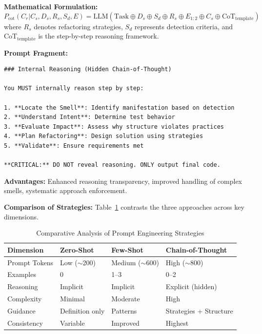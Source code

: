 \documentclass[12pt]{article}
\begin{document}
\textbf{Mathematical Formulation:}
\begin{equation}
    P_{\text{cot}}(C_r | C_s, D_s, R_s, S_d, E) = \text{LLM}(\text{Task} \oplus D_s \oplus S_d \oplus R_s \oplus E_{1:2} \oplus C_s \oplus \text{CoT}_{\text{template}})
\end{equation}
where $R_s$ denotes refactoring strategies, $S_d$ represents detection criteria, and $\text{CoT}_{\text{template}}$ is the step-by-step reasoning framework.

\textbf{Prompt Fragment:}
\begin{lstlisting}[caption=CoT Internal Reasoning Template]
### Internal Reasoning (Hidden Chain-of-Thought)

You MUST internally reason step by step:

1. **Locate the Smell**: Identify manifestation based on detection
2. **Understand Intent**: Determine test behavior
3. **Evaluate Impact**: Assess why structure violates practices
4. **Plan Refactoring**: Design solution using strategies
5. **Validate**: Ensure requirements met

**CRITICAL:** DO NOT reveal reasoning. ONLY output final code.
\end{lstlisting}

\textbf{Advantages:} Enhanced reasoning transparency, improved handling of complex smells, systematic approach enforcement.

\textbf{Comparison of Strategies:}
Table~\ref{tab:prompt-comparison} contrasts the three approaches across key dimensions.

\begin{table}[h]
\centering
\caption{Comparative Analysis of Prompt Engineering Strategies}
\label{tab:prompt-comparison}
\begin{tabular}{@{}llll@{}}
\toprule
\textbf{Dimension} & \textbf{Zero-Shot} & \textbf{Few-Shot} & \textbf{Chain-of-Thought} \\ \midrule
Prompt Tokens & Low ($\sim$200) & Medium ($\sim$600) & High ($\sim$800) \\
Examples & 0 & 1--3 & 0--2 \\
Reasoning & Implicit & Implicit & Explicit (hidden) \\
Complexity & Minimal & Moderate & High \\
Guidance & Definition only & Patterns & Strategies + Structure \\
Consistency & Variable & Improved & Highest \\ \bottomrule
\end{tabular}
\end{table}
\end{document}
